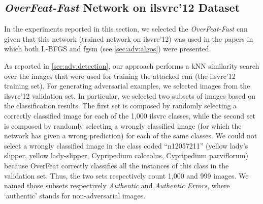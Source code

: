 
\subsection{\emph{OverFeat-Fast} Network on \acrshort{ilsvrc}'12 Dataset}
\label{subsec:adv:overfeat}
In the experiments reported in this section, we selected the \emph{OverFeat-Fast} \gls{cnn}~\cite{sermanet2013overfeat} given that this network (trained network on \gls{ilsvrc}'12) was used in the papers in which both L-BFGS and \acrlong{fgsm} (see \ref{sec:adv:algos}) were presented.

As reported in \ref{sec:adv:detection}, our approach performs a kNN similarity search over the images that were used for training the attacked \gls{cnn} (the \gls{ilsvrc}'12 training set).
For generating adversarial examples, we selected images from the \gls{ilsvrc}'12 validation set.
In particular, we selected two subsets of images based on the classification results.
The first set is composed by randomly selecting a correctly classified image for each of the 1,000 \gls{ilsvrc} classes, while the second set is composed by randomly selecting a wrongly classified image (for which the network has given a wrong prediction) for each of the same classes.
We could not select a wrongly classified image in the class coded ``n12057211'' (yellow lady's slipper, yellow lady-slipper, Cypripedium calceolus, Cypripedium parviflorum) because OverFeat correctly classifies all the instances of this class in the validation set.
Thus, the two sets respectively count 1,000 and 999 images.
We named those subsets respectively \emph{Authentic} and \emph{Authentic Errors}, where `authentic' stands for non-adversarial images.

